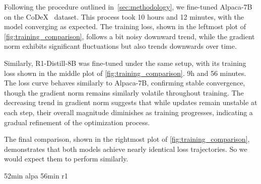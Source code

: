 \documentclass[12pt,a4paper]{article}
\newcommand{\modelalpaca}{Alpaca-7B\xspace}
\newcommand{\modeldeepseek}{R1-Distill-8B\xspace}
\begin{document}

Following the procedure outlined in~\cref{sec:methodology}, we fine-tuned \modelalpaca on the CoDeX~\cite{safavi2020codex} dataset.
This process took 10 hours and 12 minutes, with the model converging as expected.
The training loss, shown in the leftmost plot of \cref{fig:training_comparison}, follows a bit noisy downward trend, while the gradient norm exhibits significant fluctuations but also trends downwards over time.

Similarly, \modeldeepseek was fine-tuned under the same setup, with its training loss shown in the middle plot of \cref{fig:training_comparison}.
9h and 56 minutes.
The loss curve behaves similarly to \modelalpaca, confirming stable convergence, though the gradient norm remains similarly volatile throughout training.
The decreasing trend in gradient norm suggests that while updates remain unstable at each step, their overall magnitude diminishes as training progresses, indicating a gradual refinement of the optimization process.

The final comparison, shown in the rightmost plot of \cref{fig:training_comparison}, demonstrates that both models achieve nearly identical loss trajectories.
So we would expect them to perform similarly.



52min alpa
56min r1
\end{document}
